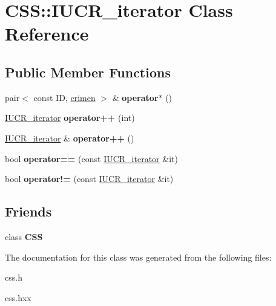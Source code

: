 \hypertarget{classCSS_1_1IUCR__iterator}{}\section{C\+S\+S\+:\+:I\+U\+C\+R\+\_\+iterator Class Reference}
\label{classCSS_1_1IUCR__iterator}
\subsection*{Public Member Functions}
\begin{DoxyCompactItemize}
\item 
\hypertarget{classCSS_1_1IUCR__iterator_a56e506f9514c4a36a431ff42b85331b0}{}pair$<$ const I\+D, \hyperlink{classcrimen}{crimen} $>$ \& {\bfseries operator$\ast$} ()\label{classCSS_1_1IUCR__iterator_a56e506f9514c4a36a431ff42b85331b0}

\item 
\hypertarget{classCSS_1_1IUCR__iterator_a3a23d1cbf4bd54624a4a8e018131cebe}{}\hyperlink{classCSS_1_1IUCR__iterator}{I\+U\+C\+R\+\_\+iterator} {\bfseries operator++} (int)\label{classCSS_1_1IUCR__iterator_a3a23d1cbf4bd54624a4a8e018131cebe}

\item 
\hypertarget{classCSS_1_1IUCR__iterator_a1365bb80b5718657cddac9c1f23ec2b7}{}\hyperlink{classCSS_1_1IUCR__iterator}{I\+U\+C\+R\+\_\+iterator} \& {\bfseries operator++} ()\label{classCSS_1_1IUCR__iterator_a1365bb80b5718657cddac9c1f23ec2b7}

\item 
\hypertarget{classCSS_1_1IUCR__iterator_a6d69e432d4979c67f520e5f8c940b6ca}{}bool {\bfseries operator==} (const \hyperlink{classCSS_1_1IUCR__iterator}{I\+U\+C\+R\+\_\+iterator} \&it)\label{classCSS_1_1IUCR__iterator_a6d69e432d4979c67f520e5f8c940b6ca}

\item 
\hypertarget{classCSS_1_1IUCR__iterator_a9c4ef290d1b3edc49ec76db5159c1871}{}bool {\bfseries operator!=} (const \hyperlink{classCSS_1_1IUCR__iterator}{I\+U\+C\+R\+\_\+iterator} \&it)\label{classCSS_1_1IUCR__iterator_a9c4ef290d1b3edc49ec76db5159c1871}

\end{DoxyCompactItemize}
\subsection*{Friends}
\begin{DoxyCompactItemize}
\item 
\hypertarget{classCSS_1_1IUCR__iterator_a2647c6d562bc3a1ae58b7b649a0d6a02}{}class {\bfseries C\+S\+S}\label{classCSS_1_1IUCR__iterator_a2647c6d562bc3a1ae58b7b649a0d6a02}

\end{DoxyCompactItemize}


The documentation for this class was generated from the following files\+:\begin{DoxyCompactItemize}
\item 
css.\+h\item 
css.\+hxx\end{DoxyCompactItemize}
